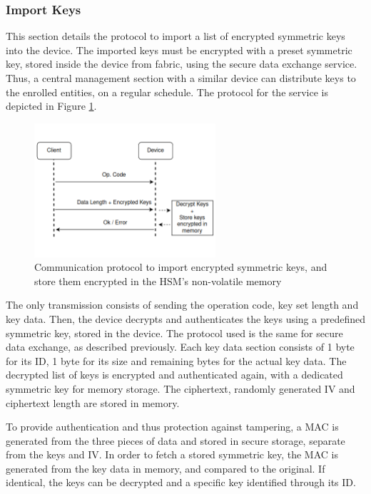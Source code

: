 \subsubsection*{Import Keys}\label{chap:arch:services:new-comms:import}

This section details the protocol to import a list of encrypted symmetric keys into the device.
The imported keys must be encrypted with a preset symmetric key, stored inside the device from fabric, using the secure data exchange service. Thus, a central management section with a similar device can distribute keys to the enrolled entities, on a regular schedule.
The protocol for the service is depicted in Figure \ref{fig:protocol:import-keys}.

\begin{figure}[h!]
	\centering
	\includegraphics[width=0.60\textwidth]{./Images/import-keys.png}
	\caption{Communication protocol to import encrypted symmetric keys, and store them encrypted in the HSM's non-volatile memory}
	\label{fig:protocol:import-keys}
\end{figure}

The only transmission consists of sending the operation code, key set length and key data. Then, the device decrypts and authenticates the keys using a predefined symmetric key, stored in the device. The protocol used is the same for secure data exchange, as described previously.
Each key data section consists of 1 byte for its ID, 1 byte for its size and remaining bytes for the actual key data.
The decrypted list of keys is encrypted and authenticated again, with a dedicated symmetric key for memory storage. 
The ciphertext, randomly generated IV and ciphertext length are stored in memory. 

To provide authentication and thus protection against tampering, a MAC is generated from the three pieces of data and stored in secure storage, separate from the keys and IV.
In order to fetch a stored symmetric key, the MAC is generated from the key data in memory, and compared to the original. If identical, the keys can be decrypted and a specific key identified through its ID.

